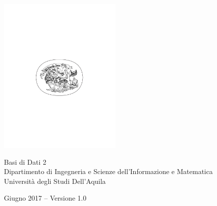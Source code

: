 
\begin{titlepage}

\begin{addmargin}[-1cm]{-3cm}
\begin{center}
\large

\hfill
\vfill

\begingroup
\color{black} \\ \bigskip %
\endgroup


\vfill

\includegraphics[width=6cm]{gfx/TFZsuperellipse_bw} \\ \medskip %

Basi di Dati 2 \\ \medskip %
Dipartimento di Ingegneria e Scienze dell'Informazione e Matematica \\
Università degli Studi Dell'Aquila \\ \bigskip

Giugno 2017 -- Versione 1.0 %

\vfill

\end{center}
\end{addmargin}

\end{titlepage}